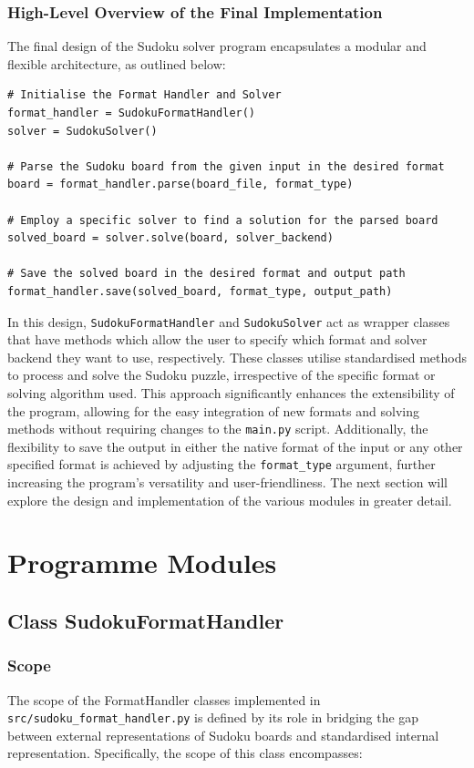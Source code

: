 \documentclass[11pt]{article}
\begin{document}
\subsubsection{High-Level Overview of the Final Implementation}
The final design of the Sudoku solver program encapsulates a modular and flexible architecture, as outlined below:

\begin{verbatim}
# Initialise the Format Handler and Solver
format_handler = SudokuFormatHandler()
solver = SudokuSolver()

# Parse the Sudoku board from the given input in the desired format
board = format_handler.parse(board_file, format_type)

# Employ a specific solver to find a solution for the parsed board 
solved_board = solver.solve(board, solver_backend)

# Save the solved board in the desired format and output path
format_handler.save(solved_board, format_type, output_path)
\end{verbatim}

In this design, \texttt{SudokuFormatHandler} and \texttt{SudokuSolver} act as wrapper classes that have methods which allow the user to specify which format and solver backend they want to use, respectively. These classes utilise standardised methods to process and solve the Sudoku puzzle, irrespective of the specific format or solving algorithm used. This approach significantly enhances the extensibility of the program, allowing for the easy integration of new formats and solving methods without requiring changes to the \texttt{main.py} script. Additionally, the flexibility to save the output in either the native format of the input or any other specified format is achieved by adjusting the \texttt{format\_type} argument, further increasing the program's versatility and user-friendliness. The next section will explore the design and implementation of the various modules in greater detail.

\section{Programme Modules}
\subsection{Class SudokuFormatHandler}

\subsubsection{Scope}
The scope of the FormatHandler classes implemented in \texttt{src/sudoku\_format\_handler.py} is defined by its role in bridging the gap between external representations of Sudoku boards and standardised internal representation. Specifically, the scope of this class encompasses:
\end{document}
